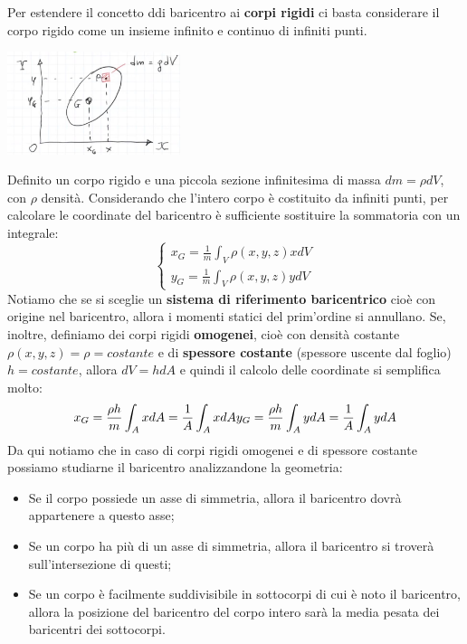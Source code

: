 Per estendere il concetto ddi baricentro ai \textbf{corpi rigidi} ci basta considerare il corpo rigido come un insieme infinito e continuo di infiniti punti.\newline
{}
\begin{center}
    \includegraphics[height=3cm]{../lezione8/img2.JPG}
\end{center}
Definito un corpo rigido e una piccola sezione infinitesima di massa $dm = \rho dV $, con $\rho$ densità. Considerando che l'intero corpo è costituito da infiniti punti, per calcolare le coordinate del baricentro è sufficiente sostituire la sommatoria con un integrale:
\[
    \begin{cases}
        x_G = \frac{1}{m} \int_V \rho (x,y,z) x dV\\
        y_G = \frac{1}{m} \int_V \rho(x,y,z) y dV
    \end{cases}
\]
Notiamo che se si sceglie un \textbf{sistema di riferimento baricentrico} cioè con origine nel baricentro, allora i momenti statici del prim'ordine si annullano.\newline
\newline
Se, inoltre, definiamo dei corpi rigidi \textbf{omogenei}, cioè con densità costante $\rho(x,y,z) = \rho = costante$ e di \textbf{spessore costante} (spessore uscente dal foglio) $h = costante$, allora $dV = h dA$ e quindi il calcolo delle coordinate si semplifica molto:
\[
    x_G = \frac{\rho h}{m} \int_{A} x dA = \frac{1}{A} \int_{A} x dA\\
    y_G = \frac{\rho h}{m} \int_{A} y dA = \frac{1}{A} \int_{A} y dA
\]
Da qui notiamo che in caso di corpi rigidi omogenei e di spessore costante possiamo studiarne il baricentro analizzandone la geometria:
\begin{itemize}
    \item Se il corpo possiede un asse di simmetria, allora il baricentro dovrà appartenere a questo asse;
    \item Se un corpo ha più di un asse di simmetria, allora il baricentro si troverà sull'intersezione di questi;
    \item Se un corpo è facilmente suddivisibile in sottocorpi di cui è noto il baricentro, allora la posizione del baricentro del corpo intero sarà la media pesata dei baricentri dei sottocorpi.
\end{itemize}
\newpage
